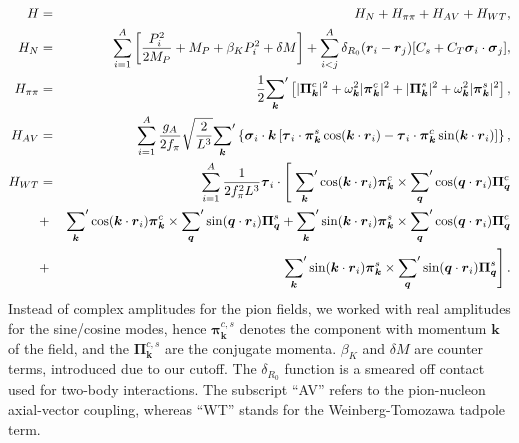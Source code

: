 \documentclass[12pt,letterpaper]{article}
\newcommand{\bvec}[1]{\boldsymbol {#1}}
\begin{document}
\begin{eqnarray}
\label{eq:hqmc}
H&=&H_N+H_{\pi\pi}+H_{AV}+H_{WT},
\nonumber\\
H_N &=& \sum_{i=1}^A \left [ \frac{P_i^2}{2M_P}+M_P
+\beta_K P_i^2 + \delta M\right ]
+\sum_{i<j}^A \delta_{R_0}(\bvec r_i-\bvec r_j)
[C_s+C_T\bvec \sigma_i\cdot \bvec \sigma_j ],
\nonumber\\
H_{\pi\pi} &=& \frac{1}{2}{\sum_{\bvec k}}' \left [
|\bvec \Pi^c_{\bvec k}|^2+
\omega_{\bvec k}^2
|\bvec \pi^c_{\bvec k}|^2
+|\bvec \Pi^s_{\bvec k}|^2+
\omega_{\bvec k}^2
|\bvec \pi^s_{\bvec k}|^2
\right ],
\nonumber\\
H_{AV} &=&
\sum_{i=1}^A
\frac{g_A}{2 f_\pi} \sqrt{\frac{2}{L^3}}
{\sum_{\bvec k}}^\prime \left\{\bvec \sigma_i \cdot \bvec k
\left[\bvec \tau_i \cdot \bvec \pi_{\bvec k}^s \cos(\bvec k \cdot \bvec r_i)
-  \bvec \tau_i\cdot \bvec \pi_{\bvec{k}}^c
\sin(\bvec k \cdot \bvec r_i)\right]\right\},
\nonumber\\
H_{WT} &=&\sum_{i=1}^A
\frac{1}{2f_\pi^2 L^3} \bvec \tau_i
\cdot \left [
\rule[-1.1em]{0em}{0em}
\right .
{\sum_{\bvec k}}' \cos(\bvec k \cdot \bvec r_i) \bvec \pi^c_{\bvec k}
\times
{\sum_{\bvec q}}' \cos(\bvec q \cdot \bvec r_i) \bvec \Pi^c_{\bvec q}
\nonumber\\
&+&
{\sum_{\bvec k}}' \cos(\bvec k \cdot \bvec r_i) \bvec \pi^c_{\bvec k}
\times
{\sum_{\bvec q}}' \sin(\bvec q \cdot \bvec r_i) \bvec \Pi^s_{\bvec q}
+
{\sum_{\bvec k}}' \sin(\bvec k \cdot \bvec r_i) \bvec \pi^s_{\bvec k}
\times
{\sum_{\bvec q}}' \cos(\bvec q \cdot \bvec r_i) \bvec \Pi^c_{\bvec q}
\nonumber\\
&+& \left .
{\sum_{\bvec k}}' \sin(\bvec k \cdot \bvec r_i) \bvec \pi^s_{\bvec k}
\times
{\sum_{\bvec q}}' \sin(\bvec q \cdot \bvec r_i) \bvec \Pi^s_{\bvec q}
\right ].
\end{eqnarray}
Instead of complex amplitudes for the pion fields, we worked with
real amplitudes for the sine/cosine modes, hence $\bvec \pi_{\bvec k}^{c,s}$
denotes the component with momentum $\bvec k$ of the field, and the $\bvec \Pi_{\bvec k}^{c,s}$ are the conjugate momenta.
$\beta_K$ and $\delta M$ are counter terms,
introduced due to our cutoff.
The $\delta_{R_0}$ function is a smeared off contact used for two-body
interactions. The subscript ``AV'' refers to the pion-nucleon axial-vector coupling, whereas ``WT'' stands for the Weinberg-Tomozawa tadpole term.
\end{document}
